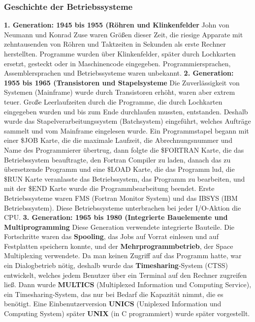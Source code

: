\documentclass{article}
\begin{document}
\subsubsection{Geschichte der Betriebssysteme}
    \textbf{1. Generation: 1945 bis 1955 (Röhren und Klinkenfelder}\newline
    John von Neumann und Konrad Zuse waren Größen dieser Zeit, die riesige Apparate mit zehntausenden von Röhren und Taktzeiten in Sekunden als erste Rechner herstellten. Programme wurden über Klinkenfelder, später durch Lochkarten ersetzt, gesteckt oder in Maschinencode eingegeben. Programmiersprachen, Assemblersprachen und Betriebssysteme waren unbekannt.\newline
    \textbf{2. Generation: 1955 bis 1965 (Transistoren und Stapelsysteme}\newline
    Die Zuverlässigkeit von Systemen (Mainframe) wurde durch Transistoren erhöht, waren aber extrem teuer. Große Leerlaufzeiten durch die Programme, die durch Lochkarten eingegeben wurden und bis zum Ende durchlaufen mussten, entstanden. Deshalb wurde das Stapelverarbeitungssystem (Batchsystem) eingeführt, welches Aufträge sammelt und vom Mainframe eingelesen wurde. Ein Programmstapel begann mit einer \$JOB Karte, die die maximale Laufzeit, die Abrechnungsnummer und Name des Programmierer übertrug, dann folgte die \$FORTRAN Karte, die das Betriebssystem beauftragte, den Fortran Compiler zu laden, danach das zu übersetzende Programm und eine \$LOAD Karte, die das Programm lud, die \$RUN Karte veranlasste das Betriebssystem, das Programm zu bearbeiten, und mit der \$END Karte wurde die Programmbearbeitung beendet.\newline
    Erste Betriebssysteme waren FMS (Fortran Monitor System) und das IBSYS (IBM Betriebssystem). Diese Betriebssysteme unterbrachen bei jeder I/O-Aktion die CPU.\newline
    \textbf{3. Generation: 1965 bis 1980 (Integrierte Bauelemente und Multiprogramming}\newline
    Diese Generation verwendete integrierte Bauteile. Die Fortschritte waren das \textbf{Spooling}, das Jobs auf Vorrat einlesen und auf Festplatten speichern konnte, und der \textbf{Mehrprogrammbetrieb}, der Space Multiplexing verwendete.\newline
    Da man keinen Zugriff auf das Programm hatte, war ein Dialogbetrieb nötig, deshalb wurde das \textbf{Timesharing}-System (CTSS) entwickelt, welches jedem Benutzer über ein Terminal auf den Rechner zugreifen ließ. Dann wurde \textbf{MULTICS} (Multiplexed Information und Computing Service), ein Timesharing-System, das nur bei Bedarf die Kapazität nimmt, die es benötigt. Eine Einbenutzerversion \textbf{UNICS} (Uniplexed Information und Computing System) später \textbf{UNIX} (in C programmiert) wurde später vorgestellt.\newline
\end{document}
